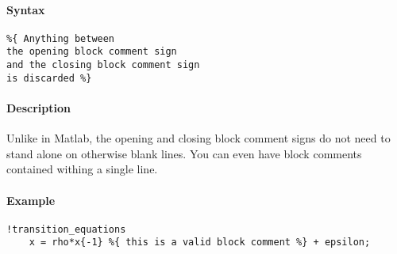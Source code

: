 


	\paragraph{Syntax}\label{syntax}

\begin{verbatim}
%{ Anything between
the opening block comment sign
and the closing block comment sign
is discarded %}
\end{verbatim}

\paragraph{Description}\label{description}

Unlike in Matlab, the opening and closing block comment signs do not
need to stand alone on otherwise blank lines. You can even have block
comments contained withing a single line.

\paragraph{Example}\label{example}

\begin{verbatim}
!transition_equations
    x = rho*x{-1} %{ this is a valid block comment %} + epsilon;
\end{verbatim}



